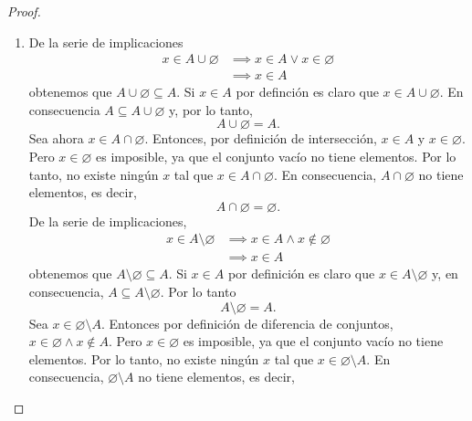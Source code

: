 \documentclass[12pt,a4paper]{book}
\begin{document}
    \begin{proof}
        \begin{enumerate}
            \item[(a)] De la serie de implicaciones
            \begin{align*}
                x\in A\cup\varnothing&\implies x\in A\lor x\in\varnothing\\
                &\implies x\in A
            \end{align*}
            obtenemos que $A\cup\varnothing\subseteq A$. Si $x\in A$ por definción es claro que $x\in A\cup\varnothing$.
            En consecuencia $A\subseteq A\cup\varnothing$ y, por lo tanto,
            \begin{equation*}
                A\cup\varnothing=A.
            \end{equation*}
            Sea ahora $x\in A\cap\varnothing$.
            Entonces, por definición de intersección, $x\in A$ y $x\in\varnothing$. Pero $x\in\varnothing$ es imposible,
            ya que el conjunto vacío no tiene elementos. Por lo tanto, no existe ningún $x$ tal que $x\in A\cap\varnothing$.
            En consecuencia, $A\cap\varnothing$ no tiene elementos, es decir,
            \begin{equation*}
                A\cap\varnothing=\varnothing.
            \end{equation*}
            De la serie de implicaciones,
            \begin{align*}
                x\in A\setminus\varnothing&\implies x\in A\wedge x\notin\varnothing\\
                &\implies x\in A
            \end{align*}
            obtenemos que $A\setminus\varnothing\subseteq A$. Si $x\in A$ por definición es claro que
            $x\in A\setminus\varnothing$ y, en consecuencia, $A\subseteq A\setminus\varnothing$. Por lo
            tanto
            \begin{equation*}
                A\setminus\varnothing=A.
            \end{equation*}
            Sea $x\in \varnothing\setminus A$. Entonces por definición de diferencia de conjuntos, $x\in\varnothing\wedge x\notin A$.
            Pero $x\in\varnothing$ es imposible, ya que el conjunto vacío no tiene elementos. Por lo tanto,
            no existe ningún $x$ tal que $x\in \varnothing\setminus A$. En consecuencia, $\varnothing\setminus A$
            no tiene elementos, es decir,
            \begin{equation*}

\end{equation*}
\end{enumerate}
\end{proof}
\end{document}
